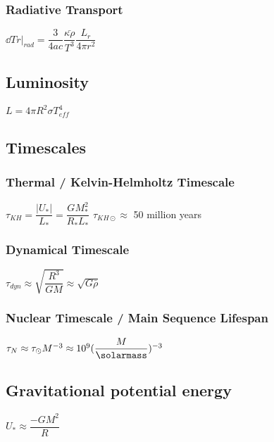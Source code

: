 \subsubsection{Radiative Transport}
\begin{itemize}
\itemt \( \dd{T}{r} |_{rad} = \dfrac{3}{4 a c} \dfrac{\bar{\kappa\rho}}{T^3} \dfrac{L_r}{4 \pi r^2} \)
\end{itemize}

	\subsection{Luminosity}
\begin{itemize}
\itemt \( L = 4\pi R^2 \sigma T_{eff}^4 \)
\end{itemize}
    
    \subsection{Timescales}

\subsubsection{Thermal / Kelvin-Helmholtz Timescale}
\begin{itemize}
\itemt \( \tau_{KH} = \dfrac{|U_*|}{L_*} = \dfrac{GM_*^2}{R_*L_*} \)
\itemt \( \tau_{KH\odot} \approx\) 50 million years
\end{itemize}

\subsubsection{Dynamical Timescale}
\begin{itemize}
\itemt \( \tau_{dyn} \approx \sqrt{\dfrac{R^3}{GM}} \approx \sqrt{G\bar{\rho}} \)
\end{itemize}

\subsubsection{Nuclear Timescale / Main Sequence Lifespan}
\begin{itemize}
\itemt \( \tau_N \approx \tau_{\odot}M^{-3} \approx 10^9 (\dfrac{M}{\si{\solarmass}})^{-3} \)
\end{itemize}


		\subsection{Gravitational potential energy}
\begin{itemize}
\itemt \( U_* \approx \dfrac{-GM^2}{R} \)
\end{itemize}

